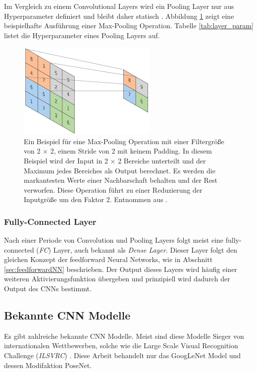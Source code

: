  Im Vergleich zu einem Convolutional Layers wird ein Pooling Layer nur aus Hyperparameter definiert und bleibt daher statisch \cite{yamashitaConvolutionalNeuralNetworks2018}. Abbildung \ref{fig:pooling_layer} zeigt eine beispielhafte Ausführung einer Max-Pooling Operation. Tabelle \ref{tab:layer_param} listet die Hyperparameter eines Pooling Layers auf.
 \vspace*{1cm}
 \begin{figure}[H]
	\centering
	\includegraphics[width=0.6\textwidth]{images/max_pool.png}
	\caption{Ein Beispiel für eine Max-Pooling Operation mit einer Filtergröße von 2 $\times$ 2, einem Stride von 2 mit keinem Padding. In diesem Beispiel wird der Input in 2 $\times$ 2 Bereiche unterteilt und der Maximum jedes Bereiches als Output berechnet. Es werden die markantesten Werte einer Nachbarschaft behalten und der Rest verworfen. Diese Operation führt zu einer Reduzierung der Inputgröße um den Faktor 2. Entnommen aus \cite{yamashitaConvolutionalNeuralNetworks2018}.}
	\label{fig:pooling_layer}
\end{figure}



\subsubsection{Fully-Connected Layer}
Nach einer Periode von Convolution und Pooling Layers folgt meist eine fully-connected (\textit{FC}) Layer, auch bekannt als \textit{Dense Layer}. Dieser Layer folgt den gleichen Konzept der feedforward Neural Networks, wie in Abschnitt \ref{sec:feedforwardNN} beschrieben. Der Output dieses Layers wird häufig einer weiteren Aktivierungsfunktion übergeben \cite{yamashitaConvolutionalNeuralNetworks2018} und prinzipiell wird dadurch der Output des CNNs bestimmt.

\subsection{Bekannte CNN Modelle}
Es gibt zahlreiche bekannte CNN Modelle. Meist sind diese Modelle Sieger von internationalen Wettbewerben, solche wie die Large Scale Visual Recognition Challenge (\textit{ILSVRC}) \cite{russakovskyImageNetLargeScale2014}. Diese Arbeit behandelt nur das GoogLeNet Model und dessen Modifaktion PoseNet. 

